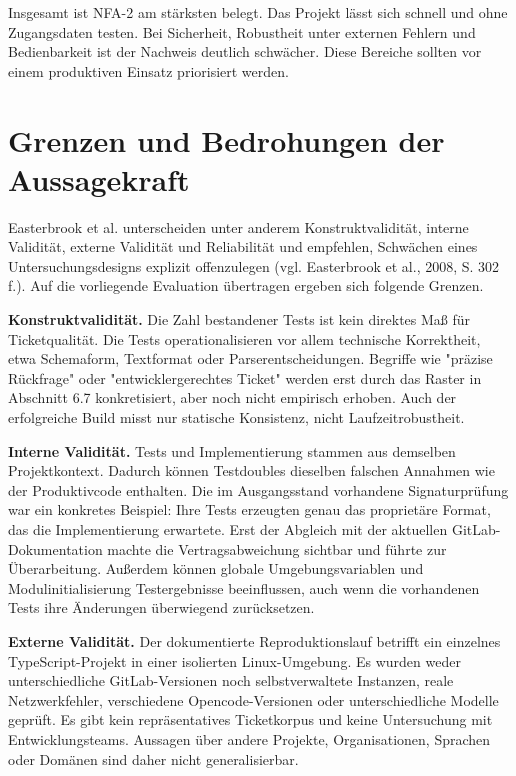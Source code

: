 Insgesamt ist NFA-2 am stärksten belegt. Das Projekt lässt sich schnell und ohne Zugangsdaten testen. Bei Sicherheit, Robustheit unter externen Fehlern und Bedienbarkeit ist der Nachweis deutlich schwächer. Diese Bereiche sollten vor einem produktiven Einsatz priorisiert werden.

\section{Grenzen und Bedrohungen der Aussagekraft}

Easterbrook et al. unterscheiden unter anderem Konstruktvalidität, interne Validität, externe Validität und Reliabilität und empfehlen, Schwächen eines Untersuchungsdesigns explizit offenzulegen (vgl. Easterbrook et al., 2008, S. 302 f.). Auf die vorliegende Evaluation übertragen ergeben sich folgende Grenzen.

\textbf{Konstruktvalidität.} Die Zahl bestandener Tests ist kein direktes Maß für Ticketqualität. Die Tests operationalisieren vor allem technische Korrektheit, etwa Schemaform, Textformat oder Parserentscheidungen. Begriffe wie "präzise Rückfrage" oder "entwicklergerechtes Ticket" werden erst durch das Raster in Abschnitt 6.7 konkretisiert, aber noch nicht empirisch erhoben. Auch der erfolgreiche Build misst nur statische Konsistenz, nicht Laufzeitrobustheit.

\textbf{Interne Validität.} Tests und Implementierung stammen aus demselben Projektkontext. Dadurch können Testdoubles dieselben falschen Annahmen wie der Produktivcode enthalten. Die im Ausgangsstand vorhandene Signaturprüfung war ein konkretes Beispiel: Ihre Tests erzeugten genau das proprietäre Format, das die Implementierung erwartete. Erst der Abgleich mit der aktuellen GitLab-Dokumentation machte die Vertragsabweichung sichtbar und führte zur Überarbeitung. Außerdem können globale Umgebungsvariablen und Modulinitialisierung Testergebnisse beeinflussen, auch wenn die vorhandenen Tests ihre Änderungen überwiegend zurücksetzen.

\textbf{Externe Validität.} Der dokumentierte Reproduktionslauf betrifft ein einzelnes TypeScript-Projekt in einer isolierten Linux-Umgebung. Es wurden weder unterschiedliche GitLab-Versionen noch selbstverwaltete Instanzen, reale Netzwerkfehler, verschiedene Opencode-Versionen oder unterschiedliche Modelle geprüft. Es gibt kein repräsentatives Ticketkorpus und keine Untersuchung mit Entwicklungsteams. Aussagen über andere Projekte, Organisationen, Sprachen oder Domänen sind daher nicht generalisierbar.

